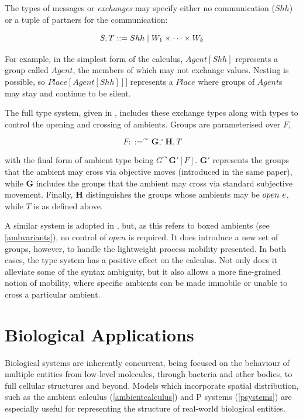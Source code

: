 The types of messages or \emph{exchanges} may specify either no
communication ($Shh$) or a tuple of partners for the communication:

\begin{equation}
S, T ::= Shh \;|\; W_1 \times \dots \times W_k
\end{equation}

\noindent For example, in the simplest form of the calculus,
$Agent[Shh]$ represents a group called $Agent$, the members of which may
not exchange values.  Nesting is possible, so $Place[Agent[Shh]]]$
represents a $Place$ where groups of $Agent$s may stay and continue to
be silent.

The full type system, given in \cite{ambienttypes}, includes these
exchange types along with types to control the opening and crossing of
ambients.  Groups are parameterised over $F$,

\begin{equation}
F ::= ^\curvearrowright \mathbf{G}, ^\circ \mathbf{H}, T
\end{equation}

\noindent with the final form of ambient type being $G^\curvearrowright
\mathbf{G'}[F]$.  $\mathbf{G'}$ represents the groups that the ambient
may cross via objective moves (introduced in the same paper), while
$\mathbf{G}$ includes the groups that the ambient may cross via standard
subjective movement.  Finally, $\mathbf{H}$ distinguishes the groups
whose ambients may be $open\ e$, while $T$ is as defined above.

A similar system is adopted in \cite{m3}, but, as this refers to boxed
ambients (see \ref{ambvariants}), no control of $open$ is required.  It
does introduce a new set of groups, however, to handle the lightweight
process mobility presented.  In both cases, the type system has a
positive effect on the calculus.  Not only does it alleviate some of
the syntax ambiguity, but it also allows a more fine-grained notion of
mobility, where specific ambients can be made immobile or unable to
cross a particular ambient.

\section{Biological Applications}
\label{bioapps}

Biological systems are inherently concurrent, being focused on the
behaviour of multiple entities from low-level molecules, through
bacteria and other bodies, to full cellular structures and beyond.
Models which incorporate spatial distribution, such as the ambient
calculus (\ref{ambientcalculus}) and P systems (\ref{psystems}) are
especially useful for representing the structure of real-world
biological entities.

